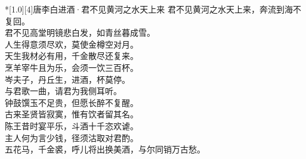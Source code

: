 \documentclass[margin=18pt,
  convert,
  convert={
    outext=.png,
    command=\unexpanded{
      pdftocairo -r 150 -png \infile %
    }
  }
]{standalone}
\begin{document}
\begin{minipage}{9.8in}
  \centering

  \begin{poem}*[1.0][4]{唐}{李白}{进酒·君不见黄河之水天上来}%
君不见黄河之水天上来，奔流到海不复回。\\
君不见高堂明镜悲白发，如青丝暮成雪。\\
人生得意须尽欢，莫使金樽空对月。\\
天生我材必有用，千金散尽还复来。\\
烹羊宰牛且为乐，会须一饮三百杯。\\
岑夫子，丹丘生，进酒，杯莫停。\\
与君歌一曲，请君为我侧耳听。\\
钟鼓馔玉不足贵，但愿长醉不复醒。\\
古来圣贤皆寂寞，惟有饮者留其名。\\
陈王昔时宴平乐，斗酒十千恣欢谑。\\
主人何为言少钱，径须沽取对君酌。\\
五花马，千金裘，呼儿将出换美酒，与尔同销万古愁。
\end{poem}
\end{minipage}


\end{document}
